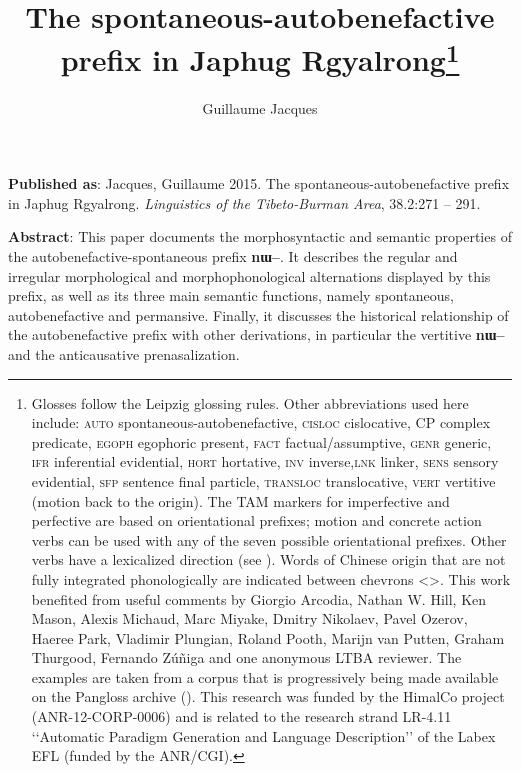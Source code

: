 \documentclass[oldfontcommands,oneside,a4paper,11pt]{article}
\newcommand{\ipa}[1]{\textbf{{\phon\mbox{#1}}}} %
\begin{document}
 
 \title{The spontaneous-autobenefactive prefix in Japhug Rgyalrong\footnote{Glosses follow the Leipzig glossing rules. Other abbreviations used here include: \textsc{auto} spontaneous-autobenefactive, \textsc{cisloc} cislocative, CP complex predicate, \textsc{egoph} egophoric present,  \textsc{fact} factual/assumptive, \textsc{genr} generic, \textsc{ifr} inferential evidential, \textsc{hort} hortative, \textsc{inv} inverse,\textsc{lnk} linker, \textsc{sens} sensory  evidential, \textsc{sfp} sentence final particle, \textsc{transloc} translocative, \textsc{vert} vertitive (motion back to the origin). The TAM markers for imperfective and perfective are based on orientational prefixes; motion and concrete action verbs can be used with any of the seven possible orientational prefixes. Other verbs have a lexicalized direction (see \citealt[266-270]{jacques14linking}).  Words of Chinese origin that are not fully integrated phonologically are indicated between chevrons <>.   This work benefited from useful comments by Giorgio  Arcodia, Nathan W. Hill, Ken Mason, Alexis Michaud, Marc Miyake, Dmitry Nikolaev, Pavel Ozerov, Haeree Park, Vladimir Plungian, Roland Pooth, Marijn van Putten, Graham Thurgood, Fernando Zúñiga and one anonymous LTBA reviewer. The examples are taken from a corpus that is progressively being made available on the Pangloss archive (\citealt{michailovsky14pangloss}). This research was funded by the HimalCo project (ANR-12-CORP-0006) and is related to the research strand LR-4.11 ‘‘Automatic Paradigm Generation and Language Description’’ of the Labex EFL (funded by the ANR/CGI).  }}
\author{Guillaume Jacques}
\maketitle
\sloppy

\textbf{Published as}: Jacques, Guillaume 2015. The spontaneous-autobenefactive prefix in Japhug Rgyalrong. \textit{Linguistics of the Tibeto-Burman Area}, 38.2:271 – 291.


\textbf{Abstract}: This paper documents the morphosyntactic and semantic properties of the autobenefactive-spontaneous prefix \ipa{nɯ--}. It describes the regular and irregular morphological and morphophonological alternations displayed by this prefix, as well as its three main semantic functions, namely spontaneous, autobenefactive and permansive. Finally, it discusses the historical relationship of the autobenefactive prefix with other derivations, in particular the vertitive \ipa{nɯ--} and the anticausative prenasalization.
\end{document}
